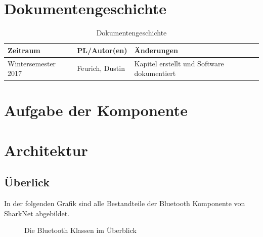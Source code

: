 \section{Dokumentengeschichte}
\begin{table}[h]
 \begin{tabular}{|l|l|p{4cm}|}
 \hline
 Zeitraum & PL/Autor(en) & Änderungen \\
 \hline
 Wintersemester 2017 & Feurich, Dustin &
Kapitel erstellt und Software dokumentiert \newline
  \\
 \hline
 \end{tabular}
 \caption{Dokumentengeschichte}
 \end{table}

\section{Aufgabe der Komponente}



\section{Architektur}

\subsection{Überlick}\label{ch:offlineoverview}

In der folgenden Grafik sind alle Bestandteile der Bluetooth Komponente von SharkNet abgebildet.
\begin{figure}[H]
	\centering
	\hspace*{1cm}
	\caption{Die Bluetooth Klassen im Überblick}
	\label{fig:bluetoothAll}
\end{figure}

